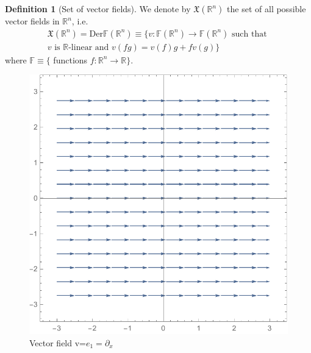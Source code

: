 \documentclass[a4paper,11pt,titlepage, article, oneside]{memoir}
\numberwithin{equation}{section}
\theoremstyle{definition}
\newtheorem{definition}[theorem]{Definition}
\theoremstyle{remark}
\newcommand{\rfield}{\mathbb{R}}
\begin{document}
\begin{definition} [Set of vector fields] \label{setsfields}
We denote by $\mathfrak{X}(\rfield^n)$ the set of all possible vector fields in $\rfield^n$, i.e.
\begin{align}
\mathfrak{X}(\rfield^n) = \text{Der}\mathbb{F}(\rfield^n) \equiv\{ v \colon \mathbb{F}(\rfield^n) \rightarrow \mathbb{F}(\rfield^n) \text{ such that } \nonumber \\
 v \text{ is } \rfield\text{-linear and } v(fg) = v(f)g + fv(g)  \}
\end{align}
where $\mathbb{F} \equiv \{$ functions $f\colon \rfield^n \rightarrow \rfield \}$.

\begin{figure}[h]
     \centering
     \includegraphics[width=.45\linewidth]{images/vfield_e1.pdf}
     \caption{Vector field v=$e_1=\partial_x$} \label{Fig:vfield_e1}
\end{figure}
\end{definition}
\end{document}
